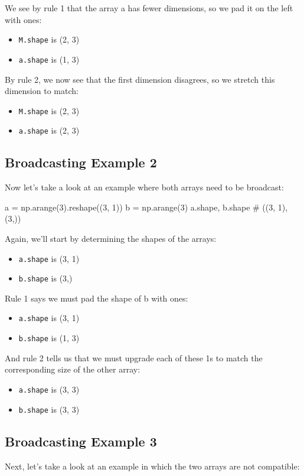 We see by rule 1 that the array a has fewer dimensions, so we pad it on the left with
ones:
\begin{itemize}
    \item \verb|M.shape| is (2, 3)
    \item \verb|a.shape| is (1, 3)
\end{itemize}

By rule 2, we now see that the first dimension disagrees, so we stretch this dimension
to match:
\begin{itemize}
    \item \verb|M.shape| is (2, 3)
    \item \verb|a.shape| is (2, 3)
\end{itemize}

\subsection{Broadcasting Example 2}
Now let's take a look at an example where both arrays need to be broadcast:

\begin{pyc}
    a = np.arange(3).reshape((3, 1))
    b = np.arange(3)
    a.shape, b.shape
    # ((3, 1), (3,))
\end{pyc}

Again, we'll start by determining the shapes of the arrays:
\begin{itemize}
    \item \verb|a.shape| is (3, 1)
    \item \verb|b.shape| is (3,)
\end{itemize}

Rule 1 says we must pad the shape of b with ones:
\begin{itemize}
    \item \verb|a.shape| is (3, 1)
    \item \verb|b.shape| is (1, 3)
\end{itemize}

And rule 2 tells us that we must upgrade each of these 1s to match the corresponding
size of the other array:
\begin{itemize}
    \item \verb|a.shape| is (3, 3)
    \item \verb|b.shape| is (3, 3)
\end{itemize}

\subsection{Broadcasting Example 3}
Next, let's take a look at an example in which the two arrays are not compatible:

